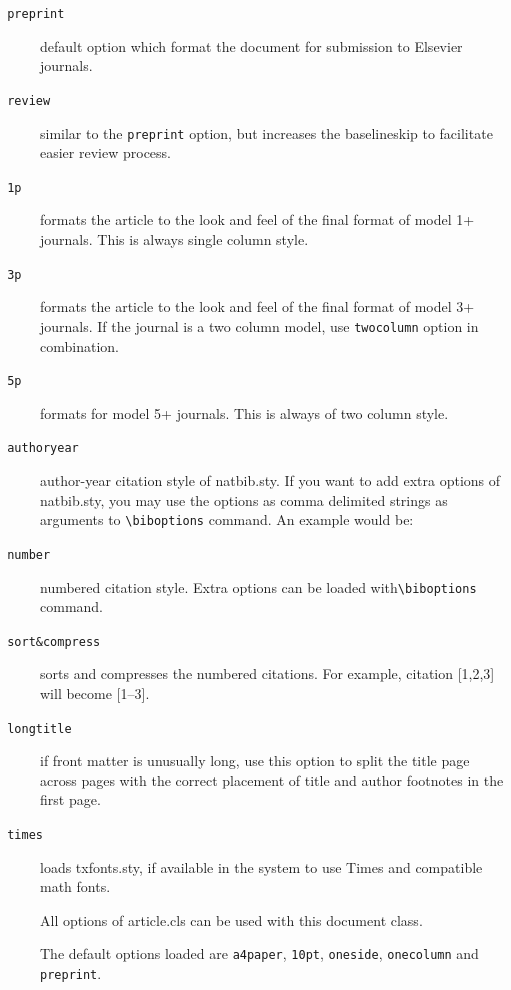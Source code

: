 \documentclass[a4paper,12pt]{article}
\def\file#1{\textsf{#1}\xspace}
\begin{document}
\begin{description}

\item [{\tt\color{verbcolor} preprint}]  default option which format the
  document for submission to Elsevier journals.

\item [{\tt\color{verbcolor} review}]  similar to the \verb+preprint+ option, but
  increases the baselineskip to facilitate easier review process.

\item [{\tt\color{verbcolor} 1p}]  formats the article to the look and feel of the final
  format of model 1+ journals. This is always single column style.

\item [{\tt\color{verbcolor} 3p}] formats the article to the look and feel of the final
  format of model 3+ journals. If the journal is a two column
model, use \verb+twocolumn+ option in combination.

\item [{\tt\color{verbcolor} 5p}] formats for model 5+ journals. This is always
  of two column style.

\item [{\tt\color{verbcolor} authoryear}] author-year citation style of
  \file{natbib.sty}. If you want to add extra options of
\file{natbib.sty}, you may use the options as comma delimited
strings as arguments to \verb+\biboptions+ command. An example
would be:
\end{description}
\begin{vquote}
\end{vquote}

\begin{description}
\item [{\tt\color{verbcolor} number}] numbered citation style. Extra options
  can be loaded with\linebreak \verb+\biboptions+ command.

\item [{\tt\color{verbcolor} sort\&compress}] sorts and compresses the
numbered citations. For example, citation [1,2,3] will become [1--3].

\item [{\tt\color{verbcolor} longtitle}] if front matter is unusually long, use
  this option to split the title page across pages with the correct
placement of title and author footnotes in the first page.

\item [{\tt\color{verbcolor} times}] loads \file{txfonts.sty}, if available in
  the system to use Times and compatible math fonts.

\item[] All options of \file{article.cls} can be used with this
  document class.

\item[] The default options loaded are \verb+a4paper+, \verb+10pt+,
  \verb+oneside+, \verb+onecolumn+ and \verb+preprint+.

\end{description}
\end{document}
